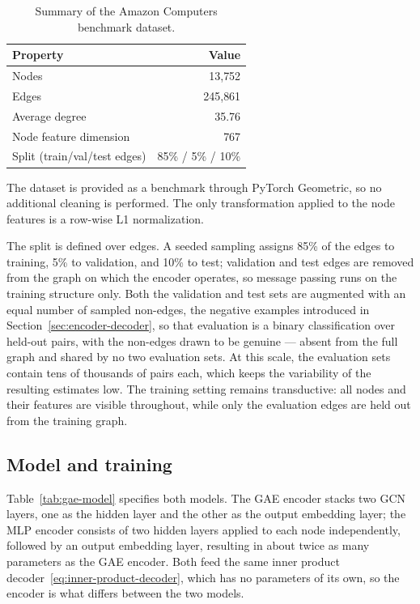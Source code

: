 \begin{table}
  \caption[Amazon Computers dataset.]{%
    Summary of the Amazon Computers benchmark dataset.
  }
  \label{tab:amazon-stats}
  \begin{center}
    \small
    \begin{tabular}{lr}
      \toprule
      Property & Value \\
      \midrule
      Nodes                        & 13{,}752 \\
      Edges                        & 245{,}861 \\
      Average degree               & 35.76 \\
      Node feature dimension       & 767 \\
      Split (train/val/test edges) & 85\% / 5\% / 10\% \\
      \bottomrule
    \end{tabular}
  \end{center}
\end{table}

The dataset is provided as a benchmark through PyTorch Geometric, so no
additional cleaning is performed. The only transformation applied to the node
features is a row-wise L1 normalization.

The split is defined over edges. A seeded sampling assigns 85\% of the edges
to training, 5\% to validation, and 10\% to test; validation and test edges
are removed from the graph on which the encoder operates, so message passing
runs on the training structure only. Both the validation and test sets are augmented
with an equal number of sampled non-edges, the negative examples introduced in
Section~\ref{sec:encoder-decoder}, so that evaluation is a binary
classification over held-out pairs, with the non-edges drawn to be genuine ---
absent from the full graph and shared by no two evaluation sets. At this scale,
the evaluation sets contain tens of thousands of pairs each, which keeps the
variability of the resulting estimates low. The training setting remains transductive:
all nodes and their features are visible throughout, while only the evaluation edges
are held out from the training graph.

\subsection{Model and training}
\label{sec:gae-training}

Table~\ref{tab:gae-model} specifies both models. The GAE encoder stacks two
GCN layers, one as the hidden layer and the other as the output embedding layer;
the MLP encoder consists of two hidden layers applied to each node
independently, followed by an output embedding layer, resulting in about twice
as many parameters as the GAE encoder. Both feed the same inner product
decoder~\eqref{eq:inner-product-decoder}, which has no parameters of its own,
so the encoder is what differs between the two models.

